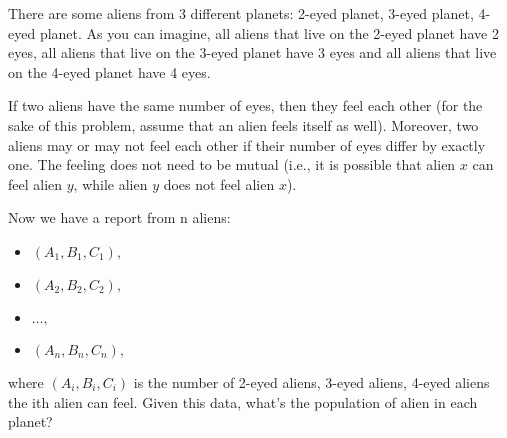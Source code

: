 There are some aliens from 3 different planets:
2-eyed planet, 3-eyed planet, 4-eyed planet.
As you can imagine, all aliens that live on the 2-eyed planet have 2 eyes,
all aliens that live on the 3-eyed planet have 3 eyes and all aliens that live on the 4-eyed planet have 4 eyes.

If two aliens have the same number of eyes,
then they feel each other (for the sake of this problem, assume that an alien feels itself as well).
Moreover, two aliens may or may not feel each other if their number of eyes differ by exactly one. The feeling does not need to be mutual (i.e., it is possible that alien $x$ can feel alien $y$, while alien $y$ does not feel alien $x$).

Now we have a report from n aliens:

\begin{itemize}
	\item $(A_1, B_1, C_1),$
	\item $(A_2, B_2, C_2),$
	\item $\ldots,$
	\item $(A_n, B_n, C_n),$
\end{itemize}

where $(A_i,B_i,C_i)$ is the number of 2-eyed aliens,
3-eyed aliens, 4-eyed aliens the ith alien can feel.
Given this data, what's the population of alien in each planet?
